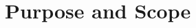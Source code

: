 \documentclass[../../../../testPlan.tex]{subfiles}
\begin{document}
	\section{Purpose and Scope}
\end{document}
